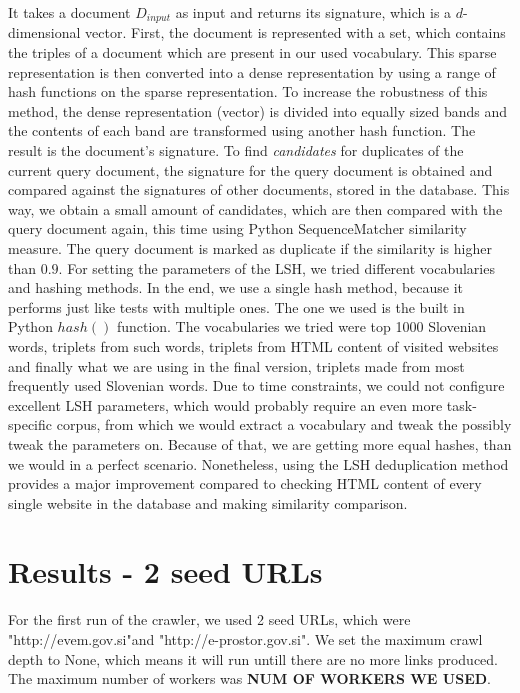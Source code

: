 \documentclass[9pt]{IEEEtran}
\begin{document}
It takes a document $D_{input}$ as input and returns its signature, which is a $d$-dimensional vector.
First, the document is represented with a set, which contains the triples of a document which are present in our used vocabulary.
This sparse representation is then converted into a dense representation by using a range of hash functions on the sparse representation.
To increase the robustness of this method, the dense representation (vector) is divided into equally sized bands and the contents of each band are transformed using another hash function.
The result is the document's signature.
To find \textit{candidates} for duplicates of the current query document, the signature for the query document is obtained and compared against the signatures of other documents, stored in the database.
This way, we obtain a small amount of candidates, which are then compared with the query document again, this time using Python SequenceMatcher similarity measure.
The query document is marked as duplicate if the similarity is higher than $0.9$.
For setting the parameters of the LSH, we tried different vocabularies and hashing methods. 
In the end, we use a single hash method, because it performs just like tests with multiple ones.
The one we used is the built in Python $hash()$ function.
The vocabularies we tried were top 1000 Slovenian words, triplets from such words, triplets from HTML content of visited websites and finally what we are using in the final version, triplets made from most frequently used Slovenian words. 
Due to time constraints, we could not configure excellent LSH parameters, which would probably require an even more task-specific corpus, from which we would extract a vocabulary and tweak the possibly tweak the parameters on.
Because of that, we are getting more equal hashes, than we would in a perfect scenario.
Nonetheless, using the LSH deduplication method provides a major improvement compared to checking HTML content of every single website in the database and making similarity comparison.


\section{Results - 2 seed URLs}
For the first run of the crawler, we used 2 seed URLs, which were "http://evem.gov.si"and "http://e-prostor.gov.si". We set the maximum crawl depth to None, which means it will run untill there are no more links produced. The maximum number of workers was \textbf{NUM OF WORKERS WE USED}.
\end{document}
